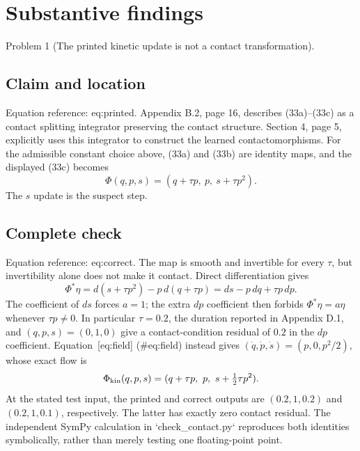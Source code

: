 \documentclass[10pt]{article}
\begin{document}
\section*{Substantive findings}
Problem 1 (The printed kinetic update is not a contact transformation).\par
\subsection*{Claim and location}
Equation reference: eq:printed. Appendix B.2, page 16, describes (33a)–(33c) as a contact splitting integrator preserving the contact structure. Section 4, page 5, explicitly uses this integrator to construct the learned contactomorphisms. For the admissible constant choice above, (33a) and (33b) are identity maps, and the displayed (33c) becomes \[
 \Phi(q,p,s)=(q+\tau p,\ p,\ s+\tau p^2).\] The \(s\) update is the suspect step.\par
\subsection*{Complete check}
Equation reference: eq:correct. The map is smooth and invertible for every \(\tau\), but invertibility alone does not make it contact. Direct differentiation gives \[\Phi^*\eta=d(s+\tau p^2)-p\,d(q+\tau p)
             =ds-p\,dq+\tau p\,dp.\] The coefficient of \(ds\) forces \(a=1\); the extra \(dp\) coefficient then forbids \(\Phi^*\eta=a\eta\) whenever \(\tau p\ne0\). In particular \(\tau=0.2\), the duration reported in Appendix D.1, and \((q,p,s)=(0,1,0)\) give a contact-condition residual of \(0.2\) in the \(dp\) coefficient. Equation [eq:field] (\#eq:field) instead gives \((\dot q,\dot p,\dot s)=(p,0,p^2/2)\), whose exact flow is \[
 \Phi_{\rm kin}(q,p,s)=(q+\tau p,\ p,\ s+\tfrac12\tau p^2).\] At the stated test input, the printed and correct outputs are \((0.2,1,0.2)\) and \((0.2,1,0.1)\), respectively. The latter has exactly zero contact residual. The independent SymPy calculation in `check\_contact.py` reproduces both identities symbolically, rather than merely testing one floating-point point.\par
\end{document}
